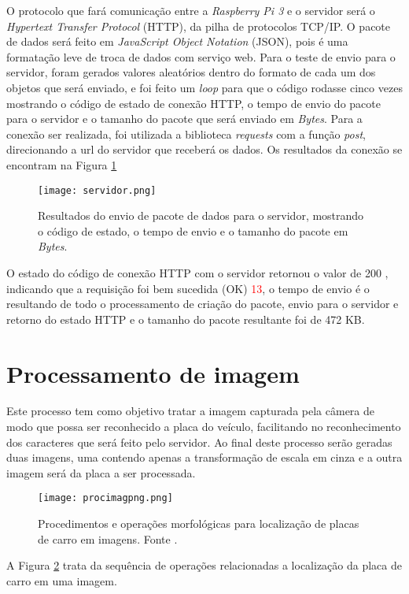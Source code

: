        
 O protocolo que fará comunicação entre a \emph{Raspberry Pi 3} e o servidor será o \emph{Hypertext Transfer Protocol} (HTTP), da pilha de protocolos TCP/IP. O pacote de dados será feito em \emph{JavaScript Object Notation} (JSON), pois é uma formatação leve de troca de dados com serviço web. Para o teste de envio para o servidor, foram gerados valores aleatórios dentro do formato de cada um dos objetos que será enviado, e foi feito um \emph{loop} para que o código rodasse cinco vezes mostrando o código de estado de conexão HTTP, o tempo de envio do pacote para o servidor e o tamanho do pacote que será enviado em \emph{Bytes}. Para a conexão ser realizada, foi utilizada a biblioteca \emph{requests} com a função \emph{post}, direcionando a url do servidor que receberá os dados. Os resultados da conexão se encontram na Figura \ref{servidor}
 
  \begin{figure}[H]
    \centering
    \texttt{[image: servidor.png]}
    \caption{Resultados do envio de pacote de dados para o servidor, mostrando o código de estado, o tempo de envio e o tamanho do pacote em \emph{Bytes}.}
    \label{servidor}
\end{figure}

O estado do código de conexão HTTP com o servidor retornou o valor de 200 , indicando que a requisição foi bem sucedida (OK) \textcolor{red}{13}, o tempo de envio é o resultando de todo o processamento de criação do pacote, envio para o servidor e retorno do estado HTTP e o tamanho do pacote resultante foi de 472 KB.

\section{Processamento de imagem}

Este processo tem como objetivo tratar a imagem capturada pela câmera de modo que possa ser reconhecido a placa do veículo, facilitando no reconhecimento dos caracteres que será feito pelo servidor. Ao final deste processo serão geradas duas imagens, uma contendo apenas a transformação de escala em cinza e a outra imagem será da placa a ser processada.
\begin{figure}[H]
    \centering
    \texttt{[image: procimagpng.png]}    \caption{Procedimentos e operações morfológicas para localização de placas de carro em imagens. Fonte \cite{Localisation}.}
    \label{fig:proc_img}
\end{figure}
A Figura \ref{fig:proc_img} trata da sequência de operações relacionadas a localização da placa de carro em uma imagem. 

